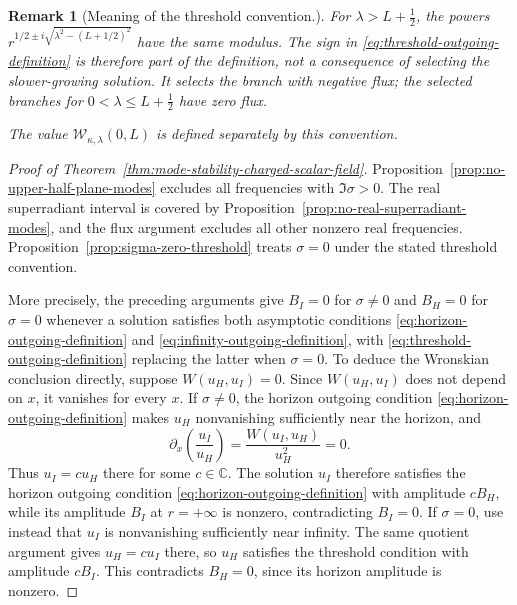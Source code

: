 \documentclass[11pt]{article}
\newtheorem{rmk}{Remark}[section]
\numberwithin{equation}{section}
\begin{document}
	\begin{rmk}[Meaning of the threshold convention.]\label{rmk.choice}
		For $\lambda>L+\frac12$, {the powers}
		$r^{1/2\pm i\sqrt{\lambda^2-(L+1/2)^2}}$ have the same modulus. The sign in
		\eqref{eq:threshold-outgoing-definition} is therefore part of the
		definition, not a consequence of selecting the slower-growing
		solution. It selects the branch with negative flux; the selected
		branches for $0<\lambda\leq L+\frac12$ have zero flux.
		
		The value $\mathcal W_{\kappa,\lambda}(0,L)$ is defined separately by
		this convention.
	\end{rmk}
	
	
	\begin{proof}[Proof of Theorem~\ref{thm:mode-stability-charged-scalar-field}]
		Proposition~\ref{prop:no-upper-half-plane-modes} excludes all
		frequencies with $\Im\sigma>0$. The real superradiant interval
		is covered by Proposition~\ref{prop:no-real-superradiant-modes},
		and the flux argument excludes all other nonzero real frequencies.
		Proposition~\ref{prop:sigma-zero-threshold} treats $\sigma=0$
		under the stated threshold convention.
		
		
		More precisely, the preceding arguments give $B_I=0$ for $\sigma\neq0$
		and $B_H=0$ for $\sigma=0$ whenever a solution satisfies both
		asymptotic conditions \eqref{eq:horizon-outgoing-definition} and \eqref{eq:infinity-outgoing-definition}{, with \eqref{eq:threshold-outgoing-definition} replacing the latter when $\sigma=0$}.
		To deduce the Wronskian conclusion directly, suppose
		$W(u_H,u_I)=0$. Since $W(u_H,u_I)$ does not depend on $x$, it vanishes for every $x$.
		If $\sigma\neq0$, the  horizon outgoing condition \eqref{eq:horizon-outgoing-definition} makes $u_H$ nonvanishing
		sufficiently near the horizon, and
		\[
		\partial_x\!\left(\frac{u_I}{u_H}\right)
		=\frac{W(u_I,u_H)}{u_H^2}=0.
		\]
		Thus $u_I=cu_H$ there for some $c\in\mathbb C$. The solution $u_I$
		therefore satisfies the horizon outgoing condition \eqref{eq:horizon-outgoing-definition} with amplitude $cB_H$,
		while its  amplitude $B_I$ at $r=+\infty$ is nonzero, contradicting $B_I=0$.
		If $\sigma=0$, use instead that $u_I$ is nonvanishing sufficiently
		near infinity. The same quotient argument gives $u_H=cu_I$ there,
		so $u_H$ satisfies the threshold condition with amplitude $cB_I$.
		This contradicts $B_H=0$, since its horizon amplitude is nonzero.
		
		
	\end{proof}
	
\end{document}
